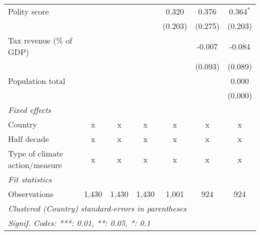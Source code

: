 \begin{tabular}{lcccccc}
   Polity score                                             &               &               &                & 0.320          & 0.376          & 0.364$^{*}$\\   
                                                            &               &               &                & (0.203)        & (0.275)        & (0.203)\\   
   Tax revenue (\% of GDP)                                  &               &               &                &                & -0.007         & -0.084\\   
                                                            &               &               &                &                & (0.093)        & (0.089)\\   
   Population total                                         &               &               &                &                &                & 0.000\\   
                                                            &               &               &                &                &                & (0.000)\\   
   \emph{Fixed effects}\\
   Country                                                  & x             & x             & x              & x              & x              & x\\  
   Half decade                                              & x             & x             & x              & x              & x              & x\\  
   Type of climate action/measure                           & x             & x             & x              & x              & x              & x\\  
   \midrule \emph{Fit statistics}\\
   Observations                                             & 1,430         & 1,430         & 1,430          & 1,001          & 924            & 924\\  
   \midrule
   \multicolumn{7}{l}{\emph{Clustered (Country) standard-errors in parentheses}}\\
   \multicolumn{7}{l}{\emph{Signif. Codes: ***: 0.01, **: 0.05, *: 0.1}}\\
\end{tabular}
\par\endgroup


